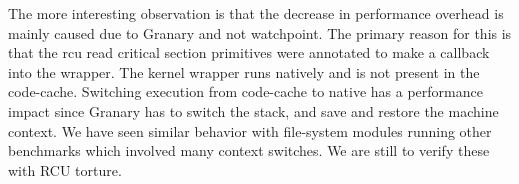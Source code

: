 

The more interesting observation is that the decrease in performance
overhead is mainly caused due to Granary and not watchpoint. The
primary reason for this is that the rcu read critical section primitives
were annotated to make a callback into the wrapper. The kernel wrapper
runs natively and is not present in the code-cache. Switching execution
from code-cache to native has a performance impact since Granary has
to switch the stack, and save and restore the machine context. We have
seen similar behavior with file-system modules running other benchmarks
which involved many context switches. We are still to verify these
with RCU torture.


